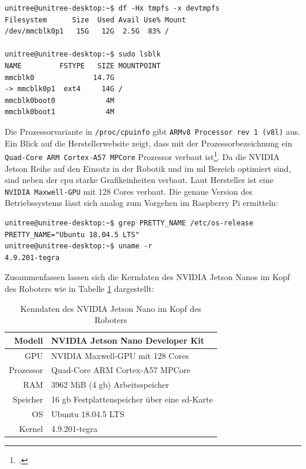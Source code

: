\begin{lstlisting}[label=lst:nanos-kopf-fs, columns=fixed]
unitree@unitree-desktop:~$ df -Hx tmpfs -x devtmpfs
Filesystem      Size  Used Avail Use% Mount
/dev/mmcblk0p1   15G   12G  2.5G  83% /

unitree@unitree-desktop:~$ sudo lsblk
NAME         FSTYPE   SIZE MOUNTPOINT
mmcblk0              14.7G
-> mmcblk0p1  ext4     14G /
mmcblk0boot0            4M
mmcblk0boot1            4M
\end{lstlisting}

\noindent Die Prozessorvariante in \texttt{/proc/cpuinfo} gibt \texttt{ARMv8 Processor rev 1 (v8l)} aus.
Ein Blick auf die Herstellerwebsite zeigt, dass mit der Prozessorbezeichnung ein \texttt{Quad-Core ARM Cortex-A57 MPCore} Prozessor verbaut ist\footcite{nvidia_website_vergleich}.
Da die NVIDIA Jetson Reihe auf den Einsatz in der Robotik und im \gls{ml} Bereich optimiert sind, sind neben der \gls{cpu}
starke Grafikeinheiten verbaut.
Laut Hersteller ist eine \texttt{NVIDIA Maxwell-GPU} mit 128 Cores verbaut.
Die genaue Version des Betriebssystems lässt sich analog zum Vorgehen im Raspberry Pi ermitteln:

\begin{lstlisting}[label=lst:nanos-kopf-os]
unitree@unitree-desktop:~$ grep PRETTY_NAME /etc/os-release
PRETTY_NAME="Ubuntu 18.04.5 LTS"
unitree@unitree-desktop:~$ uname -r
4.9.201-tegra
\end{lstlisting}

Zusammenfassen lassen sich die Kerndaten des NVIDIA Jetson Nanos im Kopf des Roboters wie in Tabelle \ref{tab:data-head-nano} dargestellt:

\begin{table}[h]
    \centering
    \begin{tabularx}{\textwidth}{|r|X|}
        \hline
        Modell    & NVIDIA Jetson Nano Developer Kit                               \\ \hline
        GPU       & NVIDIA Maxwell-GPU mit 128 Cores                               \\ \hline
        Prozessor & Quad-Core ARM Cortex-A57 MPCore                                \\ \hline
        RAM       & \num{3962} MiB (\num{4} \gls{gb}) Arbeitsspeicher              \\ \hline
        Speicher  & \num{16} \gls{gb} Festplattenspeicher über eine \gls{sd}-Karte \\ \hline
        OS        & Ubuntu 18.04.5 LTS                                             \\ \hline
        Kernel    & 4.9.201-tegra                                                  \\ \hline
    \end{tabularx}\caption{Kenndaten des NVIDIA Jetson Nano im Kopf des Roboters}\label{tab:data-head-nano}
\end{table}


